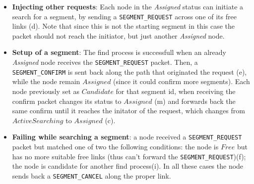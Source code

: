 \begin{itemize}
\item{\textbf{Injecting other requests}}: Each node in the
\emph{Assigned} status can initiate a search for a segment, by sending
a \texttt{SEGMENT\_REQUEST} across one of its free links (d). Note
that since this is not the starting segment in this case the packet
should not reach the initiator, but just another \emph{Assigned} node.

\item{\textbf{Setup of a segment}}: The find process is successfull
when an already \emph{Assigned} node receives the
\texttt{SEGMENT\_REQUEST} packet. Then, a \texttt{SEGMENT\_CONFIRM} is
sent back along the path that originated the request (e), while the
node remain $Assigned$ (since it could confirm more segments). Each node
previously set as $Candidate$ for that segment id, when receiving the
confirm packet changes its status to $Assigned$ (m) and forwards back
the same confirm until it reaches the initator of the request, which
changes from $ActiveSearching$ to $Assigned$ (c).

\item{\textbf{Failing while searching a segment}}: a node received a \texttt{SEGMENT\_REQUEST} packet but
matched one of two the following conditions: the node is $Free$ but has no
more suitable free links (thus can’t forward the
\texttt{SEGMENT\_REQUEST})(f); the node
is candidate for another find process(i).  In all these cases the node
sends back a \texttt{SEGMENT\_CANCEL} along the proper link. 
\end{itemize}


